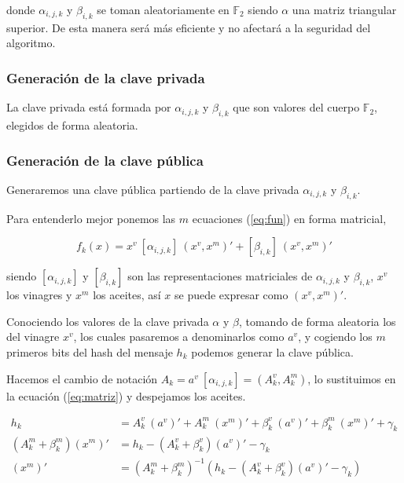 donde $\alpha_{i,j,k}$ y $\beta_{i,k}$ se toman aleatoriamente en $\mathds{F}_2$ siendo $\alpha$ una matriz triangular superior. De esta manera será más eficiente y no afectará a la seguridad del algoritmo.



\subsubsection{Generación de la clave privada}
La clave privada está formada por $\alpha_{i,j,k}$ y $\beta_{i,k}$ que son valores del cuerpo $\mathds{F}_2$, elegidos de forma aleatoria.


\subsubsection{Generación de la clave pública}
Generaremos una clave pública partiendo de la clave privada $\alpha_{i,j,k}$ y $\beta_{i,k}$.

Para entenderlo mejor ponemos las $m$ ecuaciones (\ref{eq:fun}) en forma matricial,

\begin{equation}\label{eq:matriz} 
f_k(x) = x^v\ [\alpha_{i,j,k}]\ (x^v, x^m)' + [\beta_{i,k}]\ (x^v, x^m)'
\end{equation}

siendo $[\alpha_{i,j,k}]$ y $[\beta_{i,k}]$ son las representaciones matriciales de $\alpha_{i,j,k}$ y $\beta_{i,k}$, $x^v$ los vinagres y $x^m$ los aceites, así $x$ se puede expresar como $(x^v, x^m)'$.

Conociendo los valores de la clave privada $\alpha$ y $\beta$, tomando de forma aleatoria los del vinagre $x^v$, los cuales pasaremos a denominarlos como $a^v$, y cogiendo los $m$ primeros bits del hash del mensaje $h_k$ podemos generar la clave pública.

Hacemos el cambio de notación $A_k = a^v\ [\alpha_{i,j,k}] = (A^v_k, A^m_k)$,  lo sustituimos en la ecuación (\ref{eq:matriz}) y despejamos los aceites.

\begin{align}
h_k &= A_k^v\ (a^v)' +  A_k^m\ (x^m)' + \beta_k^v\ (a^v)' + \beta_k^m\ (x^m)' + \gamma_k\\
(A_k^m + \beta_k^m) (x^m)' &= h_k - (A_k^v + \beta_k^v) (a^v)' -\gamma_k\\
\label{eq:despeje}
(x^m)' &= (A_k^m + \beta_k^m)^{-1} (h_k - (A_k^v + \beta_k^v) (a^v)' -\gamma_k)
\end{align}

